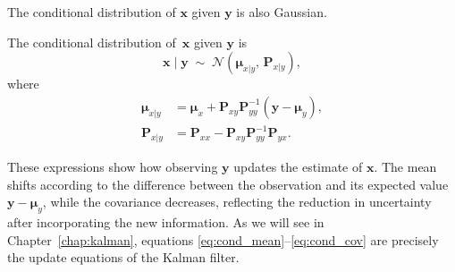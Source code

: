 The conditional distribution of $\mathbf{x}$ given $\mathbf{y}$ is also Gaussian. 
\begin{proposition}\label{prop:conditional}
The conditional distribution of\, $\mathbf{x}$ given $\mathbf{y}$ is
\[
  \mathbf{x} \mid \mathbf{y} 
  \;\sim\;
  \mathcal{N}\!\left(\boldsymbol{\mu}_{x|y},\, \mathbf{P}_{x|y}\right),
\]
where
\begin{align}
  \boldsymbol{\mu}_{x|y} &= \boldsymbol{\mu}_x + \mathbf{P}_{xy}\mathbf{P}_{yy}^{-1}(\mathbf{y} - \boldsymbol{\mu}_y),\label{eq:cond_mean}\\
  \mathbf{P}_{x|y} &= \mathbf{P}_{xx} - \mathbf{P}_{xy}\mathbf{P}_{yy}^{-1}\mathbf{P}_{yx}.\label{eq:cond_cov}
\end{align}
\end{proposition}

These expressions show how observing $\mathbf{y}$ updates the estimate of $\mathbf{x}$. The mean shifts according to the difference between the observation and its expected value $\mathbf{y} - \boldsymbol{\mu}_y$, while the covariance decreases, reflecting the reduction in uncertainty after incorporating the new information. As we will see in Chapter~\ref{chap:kalman}, equations \eqref{eq:cond_mean}--\eqref{eq:cond_cov} are precisely the update equations of the Kalman filter.



